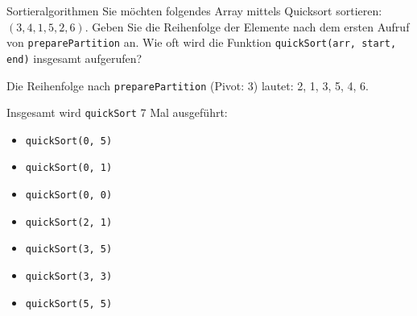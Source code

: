 \documentclass[11pt,a4paper]{article}
\begin{document}
\begin{aufgabe}{4}{Sortieralgorithmen}
        Sie möchten folgendes Array mittels Quicksort sortieren: $(3, 4, 1, 5, 2, 6)$.
        Geben Sie die Reihenfolge der Elemente nach dem ersten Aufruf von \texttt{preparePartition} an.
        Wie oft wird die Funktion \texttt{quickSort(arr, start, end)} insgesamt aufgerufen?
\end{aufgabe}
\begin{loesung}
    Die Reihenfolge nach \texttt{preparePartition} (Pivot: 3) lautet: 2, 1, 3, 5, 4, 6.

    Insgesamt wird \texttt{quickSort} 7 Mal ausgeführt:
    \begin{itemize}
        \item\texttt{quickSort(0, 5)}
        \item\texttt{quickSort(0, 1)}
        \item\texttt{quickSort(0, 0)}
        \item\texttt{quickSort(2, 1)}
        \item\texttt{quickSort(3, 5)}
        \item\texttt{quickSort(3, 3)}
        \item\texttt{quickSort(5, 5)}
    \end{itemize}
\end{loesung}
\end{document}
